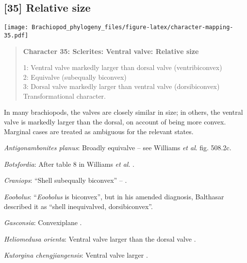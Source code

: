 \documentclass[openany]{book}
\theoremstyle{definition}
\theoremstyle{definition}
\theoremstyle{definition}
\theoremstyle{remark}
\begin{document}
\subsection*{{[}35{]} Relative size}\label{relative-size}

\texttt{[image: Brachiopod\_phylogeny\_files/figure-latex/character-mapping-35.pdf]}

\begin{quote}
\textbf{Character 35: Sclerites: Ventral valve: Relative size}

1: Ventral valve markedly larger than dorsal valve (ventribiconvex)\\
2: Equivalve (subequally biconvex)\\
3: Dorsal valve markedly larger than ventral valve (dorsibiconvex)\\
Transformational character.
\end{quote}

In many brachiopods, the valves are closely similar in size; in others,
the ventral valve is markedly larger than the dorsal, on account of
being more convex. Marginal cases are treated as ambiguous for the
relevant states.

\hypertarget{Antigonambonites_planus-coding-35}{}
\emph{Antigonambonites planus}: Broadly equivalve -- see Williams
\emph{et al}. \citeyearpar{Williams2000LinguliformeaCraniiformea} fig.
508.2c.

\hypertarget{Botsfordia-coding-35}{}
\emph{Botsfordia}: After table 8 in Williams \emph{et al}.
\citeyearpar{Williams2000LinguliformeaCraniiformea}.

\hypertarget{Craniops-coding-35}{}
\emph{Craniops}: ``Shell subequally biconvex'' --
\citet{Williams2000LinguliformeaCraniiformea}.

\hypertarget{Eoobolus-coding-35}{}
\emph{Eoobolus}: ``\emph{Eoobolus} is biconvex'', but in his amended
diagnosis, Balthasar \citeyearpar{Balthasar2009Thebrachiopod} described
it as ``shell inequivalved, dorsibiconvex''.

\hypertarget{Gasconsia-coding-35}{}
\emph{Gasconsia}: Convexiplane
\citep[p.~187]{Williams2000LinguliformeaCraniiformea}.

\hypertarget{Heliomedusa_orienta-coding-35}{}
\emph{Heliomedusa orienta}: Ventral valve larger than the dorsal valve
\citep[p.~659]{Zhang2009Architectureand}.

\hypertarget{Kutorgina_chengjiangensis-coding-35}{}
\emph{Kutorgina chengjiangensis}: Ventral valve larger \citep[see][fig.
125.]{Williams2000LinguliformeaCraniiformea}.
\end{document}
